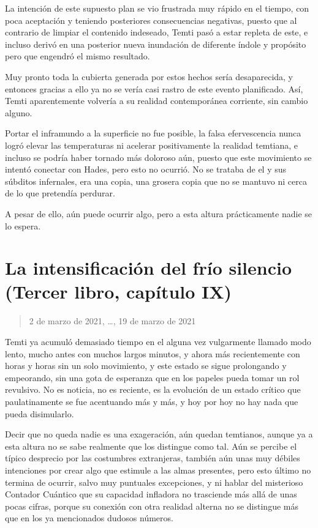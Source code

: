 \documentclass[
]{book}
\begin{document}
La intención de este supuesto plan se vio frustrada muy rápido en el tiempo, con poca aceptación y teniendo posteriores consecuencias negativas, puesto que al contrario de limpiar el contenido indeseado, Temti pasó a estar repleta de este, e incluso derivó en una posterior nueva inundación de diferente índole y propósito pero que engendró el mismo resultado.

Muy pronto toda la cubierta generada por estos hechos sería desaparecida, y entonces gracias a ello ya no se vería casi rastro de este evento planificado. Así, Temti aparentemente volvería a su realidad contemporánea corriente, sin cambio alguno.

Portar el inframundo a la superficie no fue posible, la falsa efervescencia nunca logró elevar las temperaturas ni acelerar positivamente la realidad temtiana, e incluso se podría haber tornado más doloroso aún, puesto que este movimiento se intentó conectar con Hades, pero esto no ocurrió. No se trataba de el y sus súbditos infernales, era una copia, una grosera copia que no se mantuvo ni cerca de lo que pretendía perdurar.

A pesar de ello, aún puede ocurrir algo, pero a esta altura prácticamente nadie se lo espera.

\hypertarget{la-intensificaciuxf3n-del-fruxedo-silencio-tercer-libro-capuxedtulo-ix}{%
\section{La intensificación del frío silencio (Tercer libro, capítulo IX)}\label{la-intensificaciuxf3n-del-fruxedo-silencio-tercer-libro-capuxedtulo-ix}}

\begin{quote}
2 de marzo de 2021, \ldots, 19 de marzo de 2021
\end{quote}

Temti ya acumuló demasiado tiempo en el alguna vez vulgarmente llamado modo lento, mucho antes con muchos largos minutos, y ahora más recientemente con horas y horas sin un solo movimiento, y este estado se sigue prolongando y empeorando, sin una gota de esperanza que en los papeles pueda tomar un rol revulsivo. No es noticia, no es reciente, es la evolución de un estado crítico que paulatinamente se fue acentuando más y más, y hoy por hoy no hay nada que pueda disimularlo.

Decir que no queda nadie es una exageración, aún quedan temtianos, aunque ya a esta altura no se sabe realmente que los distingue como tal. Aún se percibe el típico desprecio por las costumbres extranjeras, también aún unas muy débiles intenciones por crear algo que estimule a las almas presentes, pero esto último no termina de ocurrir, salvo muy puntuales excepciones, y ni hablar del misterioso Contador Cuántico que su capacidad infladora no trasciende más allá de unas pocas cifras, porque su conexión con otra realidad alterna no se distingue más que en los ya mencionados dudosos números.
\end{document}
